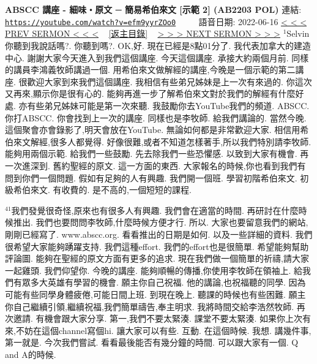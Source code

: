 \documentclass{book}
\begin{document}
\section{}
\label{sec:efm9yyrZOo0}
\textbf{ABSCC 講座 - 細味‧原文 ─ 簡易希伯來文 [示範 2] (AB2203 POL)}
\newline
\newline
連結: \href{https://youtube.com/watch?v=efm9yyrZOo0}{\texttt{https://youtube.com/watch?v=efm9yyrZOo0}} ~~~~ 語音日期: 2022-06-16
\newline
\newline
\hyperref[sec:L8_DVqUvOSM]{\small{< < < PREV SERMON < < <}}
~
\hyperref[sec:index]{\small{[返主目錄]}}
~
\hyperref[sec:3o4omcoTUB4]{\small{> > > NEXT SERMON > > >}}
\newline
\newline
$^{1}$Selvin你聽到我說話嗎?.
你聽到嗎?.
OK,好.
現在已經是8點01分了.
我代表加拿大的建造中心.
謝謝大家今天進入到我們這個講座.
今天這個講座.
承接大約兩個月前.
同樣的講員李鴻義牧師講過一個.
用希伯來文做解經的講座,今晚是一個示範的第二講座.
很歡迎大家到來我們這個講座.
我相信有些弟兄姊妹是上一次有來過的.
你這次又再來,顯示你是很有心的.
能夠再進一步了解希伯來文對於我們的解經有什麼好處.
亦有些弟兄姊妹可能是第一次來聽.
我鼓勵你去YouTube我們的頻道.
ABSCC.
你打ABSCC.
你會找到上一次的講座.
同樣也是李牧師.
給我們講論的.
當然今晚.
這個聚會亦會錄影了,明天會放在YouTube.
無論如何都是非常歡迎大家.
相信用希伯來文解經,很多人都覺得.
好像很難,或者不知道怎樣著手,所以我們特別請李牧師.
能夠用兩個示範.
給我們一些鼓勵.
先去除我們一些恐懼感.
以致到大家有機會.
再一次進深到.
舊約聖經的原文.
這一方面的東西.
大家報名的時候,你也看到我們有問到你們一個問題.
假如有足夠的人有興趣.
我們開一個班.
學習初階希伯來文.
初級希伯來文.
有收費的.
是不高的,一個短短的課程.

$^{41}$我們發覺很奇怪,原來也有很多人有興趣.
我們會在適當的時間.
再研討在什麼時候推出.
我們也要問問李牧師,什麼時候方便才行.
所以.
大家也要留意我們的網站,剛剛已經寫了.
www.abscc.org.
看看推出的日期是如何.
以及一些詳細的資料.
我們很希望大家能夠踴躍支持.
我們這種effort.
我們的effort也是很簡單.
希望能夠幫助評論圖.
能夠在聖經的原文方面有更多的追求.
現在我們做一個簡單的祈禱,請大家一起雞頭.
我們仰望你.
今晚的講座.
能夠順暢的傳播,你使用李牧師在領袖上.
給我們有眾多大英雄有學習的機會.
願主你自己祝福.
他的講論,也祝福聽的同學.
因為可能有些同學身體疲倦,可能日間上班.
到現在晚上.
聽課的時候也有些困難.
願主你自己繼續引領,繼續祝福,我們簡單禱告,奉主明求.
我將時間交給李浩然牧師.
再次邀請.
有機會跟大家分享.
第一,我們不要太緊湊.
課堂不要太緊湊.
如果你上次有來,不妨在這個channel寫個hi.
讓大家可以有些.
互動.
在這個時候.
我想.
講幾件事,第一就是.
今次我們嘗試.
看看最後能否有幾分鐘的時間.
可以跟大家有一個.
Q and A的時候.
\end{document}

